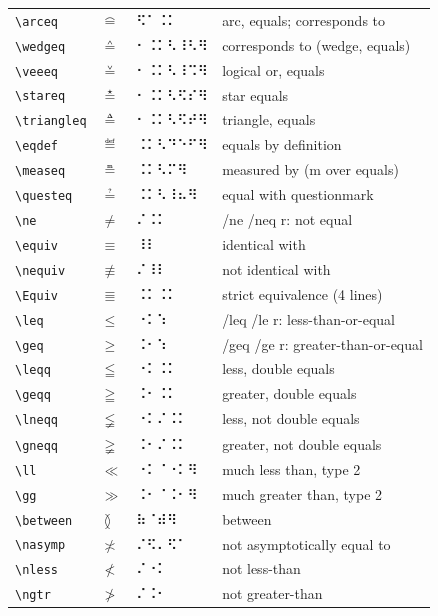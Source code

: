 \documentclass[oneside]{article}
\begin{document}
\begin{longtable}{llll}
\verb|\arceq| & $\arceq$ &   ⠫⠁⠨⠅   & {arc, equals; corresponds to} \\[2ex]
\verb|\wedgeq| & $\wedgeq$ &   ⠂⠨⠅⠣⠸⠣⠻   & {corresponds to (wedge, equals)} \\[2ex]
\verb|\veeeq| & $\veeeq$ &   ⠂⠨⠅⠣⠸⠩⠻   & {logical or, equals} \\[2ex]
\verb|\stareq| & $\stareq$ &   ⠂⠨⠅⠣⠫⠎⠻   & {star equals} \\[2ex]
\verb|\triangleq| & $\triangleq$ &   ⠂⠨⠅⠣⠫⠞⠻   & {triangle, equals} \\[2ex]
\verb|\eqdef| & $\eqdef$ &   ⠨⠅⠣⠙⠑⠋⠻   & {equals by definition} \\[2ex]
\verb|\measeq| & $\measeq$ &   ⠨⠅⠣⠍⠻   & {measured by (m over equals)} \\[2ex]
\verb|\questeq| & $\questeq$ &   ⠨⠅⠣⠸⠦⠻   & {equal with questionmark} \\[2ex]
\verb|\ne| & $\ne$ &   ⠌⠨⠅   & {/ne /neq r: not equal} \\[2ex]
\verb|\equiv| & $\equiv$ &   ⠸⠇   & {identical with} \\[2ex]
\verb|\nequiv| & $\nequiv$ &   ⠌⠸⠇   & {not identical with} \\[2ex]
\verb|\Equiv| & $\Equiv$ &   ⠨⠅⠨⠅   & {strict equivalence (4 lines)} \\[2ex]
\verb|\leq| & $\leq$ &   ⠐⠅⠱   & {/leq /le r: less-than-or-equal} \\[2ex]
\verb|\geq| & $\geq$ &   ⠨⠂⠱   & {/geq /ge r: greater-than-or-equal} \\[2ex]
\verb|\leqq| & $\leqq$ &   ⠐⠅⠨⠅   & {less, double equals} \\[2ex]
\verb|\geqq| & $\geqq$ &   ⠨⠂⠨⠅   & {greater, double equals} \\[2ex]
\verb|\lneqq| & $\lneqq$ &   ⠐⠅⠌⠨⠅   & {less, not double equals} \\[2ex]
\verb|\gneqq| & $\gneqq$ &   ⠨⠂⠌⠨⠅   & {greater, not double equals} \\[2ex]
\verb|\ll| & $\ll$ &   ⠐⠅⠈⠐⠅⠻   & {much less than, type 2} \\[2ex]
\verb|\gg| & $\gg$ &   ⠨⠂⠈⠨⠂⠻   & {much greater than, type 2} \\[2ex]
\verb|\between| & $\between$ &   ⠷⠈⠾⠻   & {between} \\[2ex]
\verb|\nasymp| & $\nasymp$ &   ⠌⠫⠄⠫⠁   & {not asymptotically equal to} \\[2ex]
\verb|\nless| & $\nless$ &   ⠌⠐⠅   & {not less-than} \\[2ex]
\verb|\ngtr| & $\ngtr$ &   ⠌⠨⠂   & {not greater-than} \\[2ex]

\end{longtable}
\end{document}
